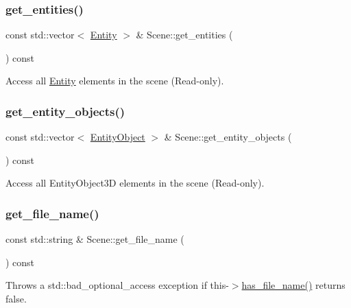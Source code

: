 \subsubsection{\texorpdfstring{get\+\_\+entities()}{get\_entities()}}
{\footnotesize\ttfamily const std\+::vector$<$ \mbox{\hyperlink{class_entity}{Entity}} $>$ \& Scene\+::get\+\_\+entities (\begin{DoxyParamCaption}{ }\end{DoxyParamCaption}) const}

Access all \mbox{\hyperlink{class_entity}{Entity}} elements in the scene (Read-\/only). \mbox{\label{class_scene_a7075fa6e5074ea029e71620c9f2c3f96}} 
\subsubsection{\texorpdfstring{get\+\_\+entity\+\_\+objects()}{get\_entity\_objects()}}
{\footnotesize\ttfamily const std\+::vector$<$ \mbox{\hyperlink{class_entity_object}{Entity\+Object}} $>$ \& Scene\+::get\+\_\+entity\+\_\+objects (\begin{DoxyParamCaption}{ }\end{DoxyParamCaption}) const}

Access all Entity\+Object3D elements in the scene (Read-\/only). \mbox{\label{class_scene_ad421371655da7444220b21ba150ee3ce}} 
\subsubsection{\texorpdfstring{get\+\_\+file\+\_\+name()}{get\_file\_name()}}
{\footnotesize\ttfamily const std\+::string \& Scene\+::get\+\_\+file\+\_\+name (\begin{DoxyParamCaption}{ }\end{DoxyParamCaption}) const}

Throws a std\+::bad\+\_\+optional\+\_\+access exception if this-\/$>$\mbox{\hyperlink{class_scene_a743728388c669fc24f8bd3630f785fbe}{has\+\_\+file\+\_\+name()}} returns false. \mbox{\label{class_scene_a3fdb6bc9788cb39da0ac9604f56327bf}} 
